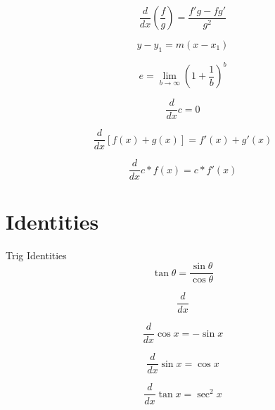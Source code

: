 \documentclass[12pt, english]{article}
\begin{document}
\noindent
{}
\begin{equation}
	\frac{d}{dx} \left(\frac{f}{g}\right) = \frac{f'g - fg'}{g^2}
\end{equation}

\noindent
{}
\begin{equation}
	y-y_1 = m(x-x_1) 
\end{equation}

\noindent
{}
\begin{equation}
	e = \lim_{b \to \infty} (1+\frac{1}{b})^b 
\end{equation}

\noindent
{}
\begin{equation}
	\frac{d}{dx} c = 0 
\end{equation}

\noindent
{}
\begin{equation}
	\frac{d}{dx} [f(x)+g(x)] = f'(x)+g'(x) 
\end{equation}

\noindent
{}
\begin{equation}
	\frac{d}{dx} c * f(x) = c * f'(x) 
\end{equation}

\section{Identities}
Trig Identities
\begin{equation}
	\tan \theta = \frac{\sin \theta}{\cos \theta}
\end{equation}

\noindent
{}
\begin{equation}
	\frac{d}{dx} 
\end{equation}

\noindent
{}
\begin{equation}
	\frac{d}{dx} \cos x = -\sin x
\end{equation}

\noindent
{}
\begin{equation}
	\frac{d}{dx} \sin x = \cos x
\end{equation}

\noindent
{}
\begin{equation}
	\frac{d}{dx} \tan x = \sec^2 x
\end{equation}
\end{document}
